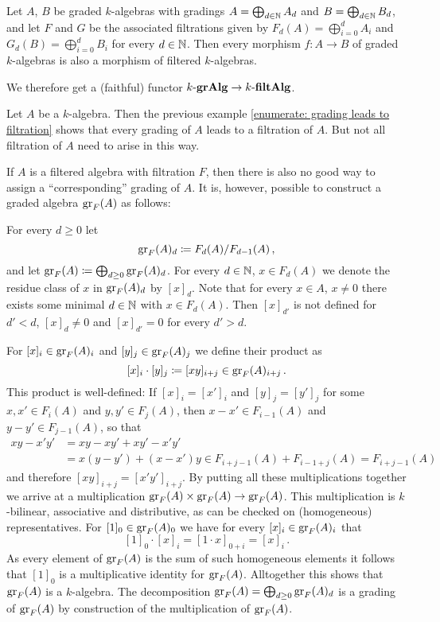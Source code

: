 \begin{example}
  Let $A$, $B$ be graded $k$-algebras with gradings $A = \bigoplus_{d \in \mathbb{N}} A_d$ and $B = \bigoplus_{d \in \mathbb{N}} B_d$, and let $F$ and $G$ be the associated filtrations given by $F_d(A) = \bigoplus_{i=0}^d A_i$ and $G_d(B) = \bigoplus_{i=0}^d B_i$ for every $d \in \mathbb{N}$.
  Then every morphism $f \colon A \to B$ of graded $k$-algebras is also a morphism of filtered $k$-algebras.
  
  We therefore get a (faithful) functor $k\text{-}\mathbf{grAlg} \to k\text{-}\mathbf{filtAlg}$.
\end{example}


\begin{fluff}
  Let $A$ be a $k$-algebra.
  Then the previous example \ref{enumerate: grading leads to filtration} shows that every grading of $A$ leads to a filtration of $A$.
  But not all filtration of $A$ need to arise in this way. %
  
  If $A$ is a filtered algebra with filtration $F$, then there is also no good way to assign a “corresponding” grading of $A$. %
  It is, however, possible to construct a graded algebra $\operatorname{gr}_F(A)$ as follows:
  
  For every $d \geq 0$ let
  \[
              \operatorname{gr}_F(A)_d
    \coloneqq  F_d(A) / F_{d-1}(A) \,,
  \]
  and let $\operatorname{gr}_F(A) \coloneqq \bigoplus_{d \geq 0} \operatorname{gr}_F(A)_d$.
  For every $d \in \mathbb{N}$, $x \in F_d(A)$ we denote the residue class of $x$ in $\operatorname{gr}_F(A)_d$ by $[x]_d$.
  Note that for every $x \in A$, $x \neq 0$ there exists some minimal $d \in \mathbb{N}$ with $x \in F_d(A)$.
  Then $[x]_{d'}$ is not defined for $d' < d$, $[x]_d \neq 0$ and $[x]_{d'} = 0$ for every $d' > d$.
  
  For $[x]_i \in \operatorname{gr}_F(A)_i$ and $[y]_j \in \operatorname{gr}_F(A)_j$ we define their product as
  \[
              [x]_i \cdot [y]_j
    \coloneqq  [xy]_{i+j}
    \in       \operatorname{gr}_F(A)_{i+j} \,.
  \]
  This product is well-defined:
  If $[x]_i = [x']_i$ and $[y]_j = [y']_j$ for some $x, x' \in F_i(A)$ and $y, y' \in F_j(A)$, then $x - x' \in F_{i-1}(A)$ and $y - y' \in F_{j-1}(A)$, so that
  \begin{align*}
          xy - x'y'
    &=    xy - xy' + xy' - x'y' \\
    &=    x(y-y') + (x-x')y
     \in  F_{i+j-1}(A) + F_{i-1+j}(A)
     =    F_{i+j-1}(A)
  \end{align*}
  and therefore $[xy]_{i+j} = [x'y']_{i+j}$.
  By putting all these multiplications together we arrive at a multiplication $\operatorname{gr}_F(A) \times \operatorname{gr}_F(A) \to \operatorname{gr}_F(A)$.
  This multiplication is $k$-bilinear, associative and distributive, as can be checked on (homogeneous) representatives.
  For $[1]_0 \in \operatorname{gr}_F(A)_0$ we have for every $[x]_i \in \operatorname{gr}_F(A)_i$ that
  \[
        [1]_0 \cdot [x]_i
    =   [1 \cdot x]_{0+i}
    =   [x]_i \,.
  \]
  As every element of $\operatorname{gr}_F(A)$ is the sum of such homogeneous elements it follows that $[1]_0$ is a multiplicative identity for $\operatorname{gr}_F(A)$.
  Alltogether this shows that $\operatorname{gr}_F(A)$ is a $k$-algebra.
  The decomposition $\operatorname{gr}_F(A) = \bigoplus_{d \geq 0} \operatorname{gr}_F(A)_d$ is a grading of $\operatorname{gr}_F(A)$ by construction of the multiplication of $\operatorname{gr}_F(A)$.
  

\end{fluff}
